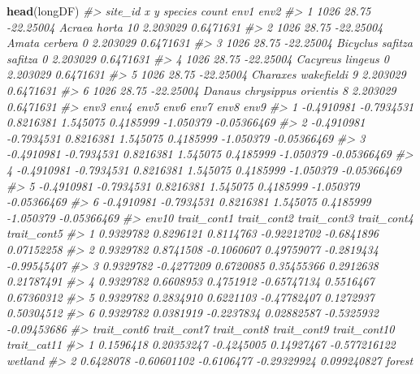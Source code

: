 \documentclass[
]{article}
\newenvironment{Shaded}{\begin{snugshade}}{\end{snugshade}}
\newcommand{\CommentTok}[1]{\textcolor[rgb]{0.56,0.35,0.01}{\textit{#1}}}
\newcommand{\FunctionTok}[1]{\textcolor[rgb]{0.13,0.29,0.53}{\textbf{#1}}}
\newcommand{\NormalTok}[1]{#1}
\begin{document}
\begin{Shaded}
\begin{Highlighting}[]
\FunctionTok{head}\NormalTok{(longDF)}
\CommentTok{\#\textgreater{}   site\_id     x         y                    species count     env1      env2}
\CommentTok{\#\textgreater{} 1    1026 28.75 {-}22.25004               Acraea horta    10 2.203029 0.6471631}
\CommentTok{\#\textgreater{} 2    1026 28.75 {-}22.25004              Amata cerbera     0 2.203029 0.6471631}
\CommentTok{\#\textgreater{} 3    1026 28.75 {-}22.25004   Bicyclus safitza safitza     0 2.203029 0.6471631}
\CommentTok{\#\textgreater{} 4    1026 28.75 {-}22.25004           Cacyreus lingeus     0 2.203029 0.6471631}
\CommentTok{\#\textgreater{} 5    1026 28.75 {-}22.25004        Charaxes wakefieldi     9 2.203029 0.6471631}
\CommentTok{\#\textgreater{} 6    1026 28.75 {-}22.25004 Danaus chrysippus orientis     8 2.203029 0.6471631}
\CommentTok{\#\textgreater{}         env3       env4      env5     env6      env7      env8        env9}
\CommentTok{\#\textgreater{} 1 {-}0.4910981 {-}0.7934531 0.8216381 1.545075 0.4185999 {-}1.050379 {-}0.05366469}
\CommentTok{\#\textgreater{} 2 {-}0.4910981 {-}0.7934531 0.8216381 1.545075 0.4185999 {-}1.050379 {-}0.05366469}
\CommentTok{\#\textgreater{} 3 {-}0.4910981 {-}0.7934531 0.8216381 1.545075 0.4185999 {-}1.050379 {-}0.05366469}
\CommentTok{\#\textgreater{} 4 {-}0.4910981 {-}0.7934531 0.8216381 1.545075 0.4185999 {-}1.050379 {-}0.05366469}
\CommentTok{\#\textgreater{} 5 {-}0.4910981 {-}0.7934531 0.8216381 1.545075 0.4185999 {-}1.050379 {-}0.05366469}
\CommentTok{\#\textgreater{} 6 {-}0.4910981 {-}0.7934531 0.8216381 1.545075 0.4185999 {-}1.050379 {-}0.05366469}
\CommentTok{\#\textgreater{}       env10 trait\_cont1 trait\_cont2 trait\_cont3 trait\_cont4 trait\_cont5}
\CommentTok{\#\textgreater{} 1 0.9329782   0.8296121   0.8114763 {-}0.92212702  {-}0.6841896  0.07152258}
\CommentTok{\#\textgreater{} 2 0.9329782   0.8741508  {-}0.1060607  0.49759077  {-}0.2819434 {-}0.99545407}
\CommentTok{\#\textgreater{} 3 0.9329782  {-}0.4277209   0.6720085  0.35455366   0.2912638  0.21787491}
\CommentTok{\#\textgreater{} 4 0.9329782   0.6608953   0.4751912 {-}0.65747134   0.5516467  0.67360312}
\CommentTok{\#\textgreater{} 5 0.9329782   0.2834910   0.6221103 {-}0.47782407   0.1272937  0.50304512}
\CommentTok{\#\textgreater{} 6 0.9329782   0.0381919  {-}0.2237834  0.02882587  {-}0.5325932 {-}0.09453686}
\CommentTok{\#\textgreater{}   trait\_cont6 trait\_cont7 trait\_cont8 trait\_cont9 trait\_cont10 trait\_cat11}
\CommentTok{\#\textgreater{} 1   0.1596418  0.20353247  {-}0.4245005  0.14927467 {-}0.577216122     wetland}
\CommentTok{\#\textgreater{} 2   0.6428078 {-}0.60601102  {-}0.6106477 {-}0.29329924  0.099240827      forest}

\end{Highlighting}
\end{Shaded}
\end{document}
